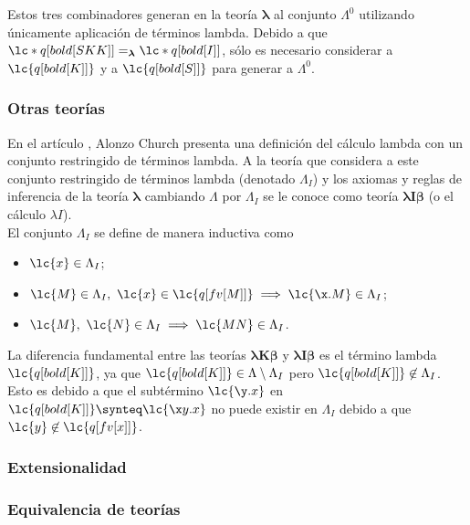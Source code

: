 Estos tres combinadores generan en la teoría \(\boldsymbol{\lambda}\) al
conjunto \(\Lambda^{0}\) utilizando únicamente aplicación de términos lambda.
Debido a que \(\lc*{q[bold[S K K]]}=_{\boldsymbol{\lambda}} \lc*{q[bold[I]]}\),
sólo es necesario considerar a \(\lc{q[bold[K]]}\) y a \(\lc{q[bold[S]]}\) para
generar a \(\Lambda^{0}\). \\

\subsubsection{Otras teorías}

En el artículo \cite{Church:LambdaConversion}, Alonzo Church presenta una
definición del cálculo lambda con un conjunto restringido de términos lambda. A
la teoría que considera a este conjunto restringido de términos lambda (denotado
\(\Lambda_{I}\)) y los axiomas  y reglas de inferencia de la teoría
\(\boldsymbol{\lambda}\) cambiando \(\Lambda\) por \(\Lambda_{I}\) se le conoce
como teoría \(\boldsymbol{\lambda I \beta}\) (o el cálculo \(\lambda I\)). \\

El conjunto \(\Lambda_{I}\) se define de manera inductiva como
\begin{itemize}
\item \(\lc{x} \in \Lambda_{I}\);
\item \(\lc{M}\in \Lambda_{I},\ \lc{x} \in \lc{q[fv[M]]} \implies \lc{\x.M} \in
  \Lambda_{I}\);
\item \(\lc{M},\ \lc{N} \in \Lambda_{I} \implies \lc{M N} \in \Lambda_{I}\).
\end{itemize}

La diferencia fundamental entre las teorías \(\boldsymbol{\lambda K \beta}\) y
\(\boldsymbol{\lambda I \beta}\) es el término lambda \(\lc{q[bold[K]]}\), ya que
\(\lc{q[bold[K]]} \in \Lambda \setminus \Lambda_{I}\) pero \(\lc{q[bold[K]]}
\not\in \Lambda_{I}\). Esto es debido a que el subtérmino \(\lc{\y.x}\) en
\(\lc{q[bold[K]]}\synteq \lc{\x y.x}\) no puede existir en \(\Lambda_{I}\)
debido a que \(\lc{y} \not\in \lc{q[fv[x]]}\). \\




\subsubsection{Extensionalidad}

\subsubsection{Equivalencia de teorías}

